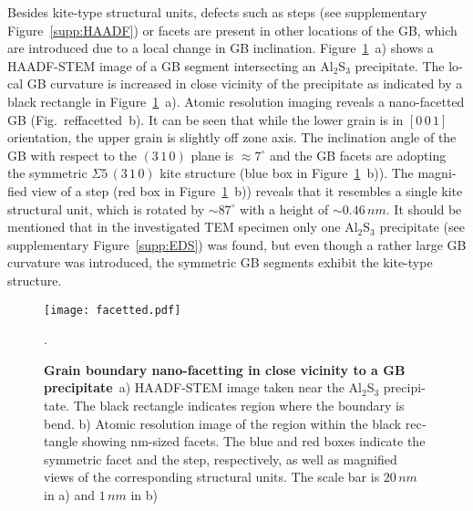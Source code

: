 \documentclass[12pt,a4paper,twoside,twocolumn,english,english]{article}
\begin{document}
\begin{otherlanguage}{english}
Besides kite-type structural units, defects such as steps (see supplementary Figure~\ref{supp:HAADF}) or facets are present in other locations of the GB, which are introduced due to a local change in GB inclination.  Figure~\ref{facetted}~a) shows a HAADF-STEM image of a GB segment intersecting an Al$_{2}$S$_{3}$ precipitate. The local GB curvature is increased in close vicinity of the precipitate as indicated by a black rectangle in Figure~\ref{facetted}~a). Atomic resolution imaging reveals a nano-facetted GB (Fig.~ref{facetted}~b). It can be seen that while the lower grain is in $[0\,0\,1]$ orientation, the upper grain is slightly off zone axis. The inclination angle of the GB with respect to the $(3\,1\,0)$ plane is $\approx 7^\circ$ and the GB facets are adopting the symmetric $\Sigma 5\,(3\,1\,0)$ kite structure (blue box in Figure~\ref{facetted}~b)). The magnified view of a step (red box in Figure~\ref{facetted}~b)) reveals that it resembles a single kite structural unit, which is rotated by $\sim87^\circ$ with a height of $\sim0.46\,nm$. It should be mentioned that in the investigated TEM specimen only one Al$_{2}$S$_{3}$ precipitate (see supplementary Figure~\ref{supp:EDS}) was found, but even though a rather large GB curvature was introduced, the symmetric GB segments exhibit the kite-type structure.\\

\begin{figure}[htbp]
\texttt{[image: facetted.pdf]}
\caption{\textbf{Grain boundary nano-facetting in close vicinity to a GB precipitate}~a) HAADF-STEM image taken near the Al$_2$S$_3$ precipitate. The black rectangle indicates region where the boundary is bend. b) Atomic resolution image of the region within the black rectangle showing nm-sized facets. The blue and red boxes indicate the symmetric facet and the step, respectively, as well as magnified views of the corresponding structural units. The scale bar is $20\,nm$ in a) and  $1\,nm$ in b)}.
\label{facetted}
\end{figure}


\end{otherlanguage}
\end{document}
